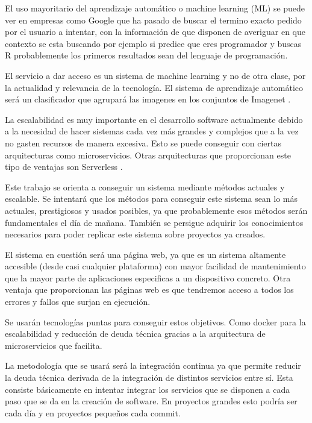 

El uso mayoritario del aprendizaje automático o machine learning (ML) se puede ver en empresas como Google que ha pasado de buscar el termino exacto pedido por el usuario a intentar, con la información de que disponen de averiguar en que contexto se esta buscando por ejemplo si predice que eres programador y buscas R probablemente los primeros resultados sean del lenguaje de programación.

El servicio a dar acceso es un sistema de machine learning y no de otra clase, por la actualidad y relevancia de la tecnología. El sistema de aprendizaje automático será un clasificador que agrupará las imagenes en los conjuntos de Imagenet \cite{imnet}.

La escalabilidad es muy importante en el desarrollo software actualmente debido a la necesidad de hacer sistemas cada vez más grandes y complejos que a la vez no gasten recursos de manera excesiva. Esto se puede conseguir con ciertas arquitecturas como microservicios. Otras arquitecturas que proporcionan este tipo de ventajas son Serverless \cite{svlops} \cite{svless}.

Este trabajo se orienta a conseguir un sistema mediante métodos actuales y escalable. Se intentará que los métodos para conseguir este sistema sean lo más actuales, prestigiosos y usados posibles, ya que probablemente esos métodos serán fundamentales el día de mañana. También se persigue adquirir los conocimientos necesarios para poder replicar este sistema sobre proyectos ya creados.

El sistema en cuestión será una página web, ya que es un sistema altamente accesible (desde casi cualquier plataforma) con mayor facilidad de mantenimiento que la mayor parte de aplicaciones especificas a un dispositivo concreto. Otra ventaja que proporcionan las páginas web es que tendremos acceso a todos los errores y fallos que surjan en ejecución.

Se usarán tecnologías puntas para conseguir estos objetivos. Como docker para la escalabilidad y reducción de deuda técnica gracias a la arquitectura de microservicios que facilita.

La metodología que se usará será la integración continua ya que permite reducir la deuda técnica derivada de la integración de distintos servicios entre sí. Esta consiste básicamente en intentar integrar los servicios que se disponen a cada paso que se da en la creación de software. En proyectos grandes esto podría ser cada día y en proyectos pequeños cada commit.
